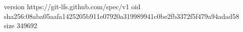 version https://git-lfs.github.com/spec/v1
oid sha256:08aba05aafa1425205b911e07920a319989941c0be2fb3372f5f479a94adad58
size 349692
